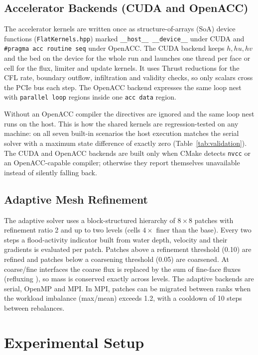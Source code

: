 \documentclass[conference]{IEEEtran}
\begin{document}
\subsection{Accelerator Backends (CUDA and OpenACC)}
The accelerator kernels are written once as structure-of-arrays (SoA) device
functions (\texttt{FlatKernels.hpp}) marked \texttt{\_\_host\_\_ \_\_device\_\_}
under CUDA and \texttt{\#pragma acc routine seq} under OpenACC. The CUDA
backend keeps $h,hu,hv$ and the bed on the device for the whole run and
launches one thread per face or cell for the flux, limiter and update kernels.
It uses Thrust reductions for the CFL rate, boundary outflow, infiltration and
validity checks, so only scalars cross the PCIe bus each step. The OpenACC
backend expresses the same loop nest with \texttt{parallel loop} regions
inside one \texttt{acc data} region.

Without an OpenACC compiler the directives are ignored and the same loop nest
runs on the host. This is how the shared kernels are regression-tested on any
machine: on all seven built-in scenarios the host execution matches the
serial solver with a maximum state difference of exactly zero
(Table~\ref{tab:validation}). The CUDA and OpenACC backends are built only
when CMake detects \texttt{nvcc} or an OpenACC-capable compiler; otherwise
they report themselves unavailable instead of silently falling back.

\subsection{Adaptive Mesh Refinement}
The adaptive solver uses a block-structured hierarchy of $8\times8$ patches with
refinement ratio 2 and up to two levels (cells $4\times$ finer than the base).
Every two steps a flood-activity indicator built from water depth, velocity
and their gradients is evaluated per patch. Patches above a refinement threshold
(0.10) are refined and patches below a coarsening threshold (0.05) are
coarsened. At coarse/fine interfaces the coarse flux is replaced by the sum of
fine-face fluxes (refluxing \cite{berger1989}), so mass is conserved exactly
across levels. The adaptive backends are serial, OpenMP and MPI. In MPI,
patches can be migrated between ranks when the workload imbalance
(max/mean) exceeds 1.2, with a cooldown of 10 steps between rebalances.

\section{Experimental Setup}
\end{document}
